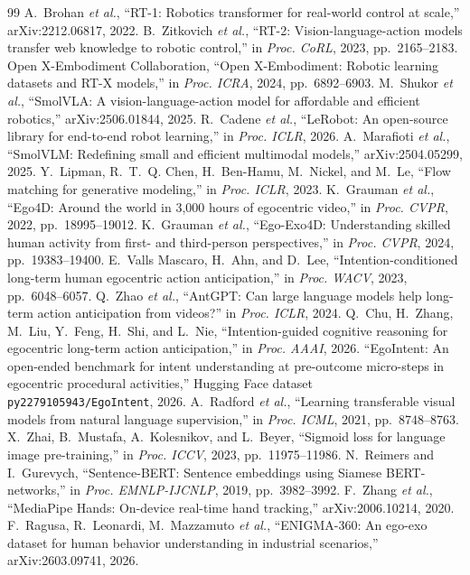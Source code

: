 \documentclass[conference,a4paper]{IEEEtran}
\begin{document}
\begin{thebibliography}{99}
 A.~Brohan \emph{et al.}, ``RT-1: Robotics transformer for real-world control at scale,'' arXiv:2212.06817, 2022.
 B.~Zitkovich \emph{et al.}, ``RT-2: Vision-language-action models transfer web knowledge to robotic control,'' in \emph{Proc. CoRL}, 2023, pp.~2165--2183.
 Open X-Embodiment Collaboration, ``Open X-Embodiment: Robotic learning datasets and RT-X models,'' in \emph{Proc. ICRA}, 2024, pp.~6892--6903.
 M.~Shukor \emph{et al.}, ``SmolVLA: A vision-language-action model for affordable and efficient robotics,'' arXiv:2506.01844, 2025.
 R.~Cadene \emph{et al.}, ``LeRobot: An open-source library for end-to-end robot learning,'' in \emph{Proc. ICLR}, 2026.
 A.~Marafioti \emph{et al.}, ``SmolVLM: Redefining small and efficient multimodal models,'' arXiv:2504.05299, 2025.
 Y.~Lipman, R.~T.~Q. Chen, H.~Ben-Hamu, M.~Nickel, and M.~Le, ``Flow matching for generative modeling,'' in \emph{Proc. ICLR}, 2023.
 K.~Grauman \emph{et al.}, ``Ego4D: Around the world in 3,000 hours of egocentric video,'' in \emph{Proc. CVPR}, 2022, pp.~18995--19012.
 K.~Grauman \emph{et al.}, ``Ego-Exo4D: Understanding skilled human activity from first- and third-person perspectives,'' in \emph{Proc. CVPR}, 2024, pp.~19383--19400.
 E.~Valls Mascaro, H.~Ahn, and D.~Lee, ``Intention-conditioned long-term human egocentric action anticipation,'' in \emph{Proc. WACV}, 2023, pp.~6048--6057.
 Q.~Zhao \emph{et al.}, ``AntGPT: Can large language models help long-term action anticipation from videos?'' in \emph{Proc. ICLR}, 2024.
 Q.~Chu, H.~Zhang, M.~Liu, Y.~Feng, H.~Shi, and L.~Nie, ``Intention-guided cognitive reasoning for egocentric long-term action anticipation,'' in \emph{Proc. AAAI}, 2026.
 ``EgoIntent: An open-ended benchmark for intent understanding at pre-outcome micro-steps in egocentric procedural activities,'' Hugging Face dataset \texttt{py2279105943/EgoIntent}, 2026.
 A.~Radford \emph{et al.}, ``Learning transferable visual models from natural language supervision,'' in \emph{Proc. ICML}, 2021, pp.~8748--8763.
 X.~Zhai, B.~Mustafa, A.~Kolesnikov, and L.~Beyer, ``Sigmoid loss for language image pre-training,'' in \emph{Proc. ICCV}, 2023, pp.~11975--11986.
 N.~Reimers and I.~Gurevych, ``Sentence-BERT: Sentence embeddings using Siamese BERT-networks,'' in \emph{Proc. EMNLP-IJCNLP}, 2019, pp.~3982--3992.
 F.~Zhang \emph{et al.}, ``MediaPipe Hands: On-device real-time hand tracking,'' arXiv:2006.10214, 2020.
 F.~Ragusa, R.~Leonardi, M.~Mazzamuto \emph{et al.}, ``ENIGMA-360: An ego-exo dataset for human behavior understanding in industrial scenarios,'' arXiv:2603.09741, 2026.


\end{thebibliography}
\end{document}
